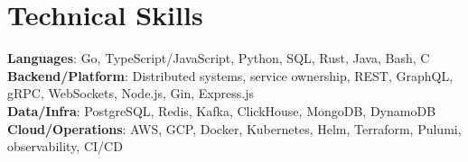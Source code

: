 \section{Technical Skills}
    \begin{itemize}[leftmargin=0.15in, label={}]
	\small{\item{
		\textbf{Languages}{: Go, TypeScript/JavaScript, Python, SQL, Rust, Java, Bash, C} \\
        \textbf{Backend/Platform}{: Distributed systems, service ownership, REST, GraphQL, gRPC, WebSockets, Node.js, Gin, Express.js} \\
        \textbf{Data/Infra}{: PostgreSQL, Redis, Kafka, ClickHouse, MongoDB, DynamoDB} \\
        \textbf{Cloud/Operations}{: AWS, GCP, Docker, Kubernetes, Helm, Terraform, Pulumi, observability, CI/CD} \\
	}}
    \end{itemize}
